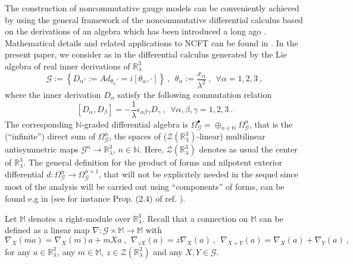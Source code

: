 \documentclass[a4paper,11pt,twoside]{article}
\numberwithin{equation}{section}
\theoremstyle{nonumberplain}
\newcounter{and}
\begin{document}
The construction of noncommutative gauge models can be conveniently achieved by using the general framework of the noncommutative differential calculus based on the derivations of an algebra which has been introduced a long ago \cite{mdv88-99}. Mathematical details and related applications to NCFT can be found in \cite{cgmw-20}. In the present paper, we consider as in \cite{gervitwal-13} the differential calculus generated by the Lie algebra of real inner derivations of $\mathbb{R}^3_\lambda$%
%
\begin{equation}
\mathcal{G} := \left\{D_\alpha \cdot := Ad_{\theta_\alpha} \cdot = i \left[\theta_\alpha, \cdot\right]\right\} \ ,  \ \ \theta_\alpha := \frac{x_\alpha}{\lambda^2} \ , \ \ \forall \alpha = 1,2,3 \ , \label{inv-form-conn}
\end{equation}
%
where the inner derivation $D_\alpha$ satisfy the following commutation relation%
%
\begin{equation}
\left[D_\alpha,D_\beta\right] = -\frac{1}{\lambda} \epsilon_{\alpha\beta\gamma} D_\gamma \ , \ \ \forall \alpha,\beta,\gamma = 1,2,3 \ . \label{Der}
\end{equation}
%
The corresponding $\mathbb{N}$-graded differential algebra is $\Omega_\mathcal{G}^\bullet = \oplus_{n\in\mathbb{N}} \Omega^n_\mathcal{G}$, that is the (``infinite'') direct sum of $\Omega^n_\mathcal{G}$, the spaces of ($\mathcal{Z}(\mathbb{R}^3_\lambda)$-linear) multilinear antisymmetric maps $\mathcal{G}^n\to\mathbb{R}^3_\lambda$, $n \in \mathbb{N}$. Here, $\mathcal{Z}(\mathbb{R}^3_\lambda)$ denotes as usual the center of $\mathbb{R}^3_\lambda$. The general definition for the product of forms and nilpotent exterior differential $d:\Omega^n_\mathcal{G}\to\Omega^{n+1}_\mathcal{G}$, that will not be explicitely needed in the sequel since most of the analysis will be carried out using ``components'' of forms, can be found e.g in \cite{cgmw-20} (see for instance Prop. (2.4) of ref. \cite{cgmw-20}). \par%
%
Let $\mathbb{M}$ denotes a right-module over $\mathbb{R}^3_\lambda$. Recall that a connection on $\mathbb{M}$ can be defined as a linear map $\nabla:\mathcal{G}\times\mathbb{M}\to\mathbb{M}$ with%
%
\begin{equation*}
\nabla_X(ma) = \nabla_X(m)a + mXa \ , \ \ \nabla_{zX}(a)=z\nabla_X(a) \ , \ \ \nabla_{X+Y}(a)=\nabla_X(a)+\nabla_Y(a) \ ,
\end{equation*}
%
for any $a\in\mathbb{R}^3_\lambda$, any $m\in\mathbb{M}$, $z\in \mathcal{Z}(\mathbb{R}^3_\lambda)$ and any $X,Y\in\mathcal{G}$.\par%
\end{document}
